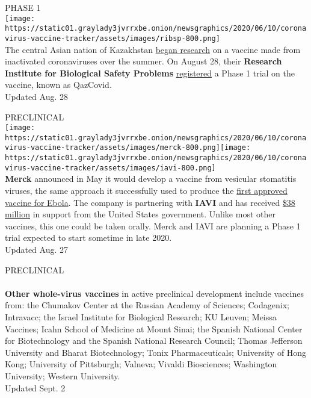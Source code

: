 PHASE 1\\
\texttt{[image: https://static01.graylady3jvrrxbe.onion/newsgraphics/2020/06/10/coronavirus-vaccine-tracker/assets/images/ribsp-800.png]}\\
The central Asian nation of Kazakhstan
\href{https://astanatimes.com/2020/08/human-trials-for-kazakh-covid-19-vaccine-to-start-in-september/}{began
research} on a vaccine made from inactivated coronaviruses over the
summer. On August 28, their \textbf{Research Institute for Biological
Safety Problems}
\href{https://clinicaltrials.gov/ct2/show/NCT04530357?term=vaccine\&recrs=adf\&cond=COVID-19\&phase=0123\&sort=nwst\&draw=2\&rank=1}{registered}
a Phase 1 trial on the vaccine, known as QazCovid.\\
Updated Aug. 28

PRECLINICAL\\
\texttt{[image: https://static01.graylady3jvrrxbe.onion/newsgraphics/2020/06/10/coronavirus-vaccine-tracker/assets/images/merck-800.png]}\texttt{[image: https://static01.graylady3jvrrxbe.onion/newsgraphics/2020/06/10/coronavirus-vaccine-tracker/assets/images/iavi-800.png]}\\
\textbf{Merck} announced in May it would develop a vaccine from
vesicular stomatitis viruses, the same approach it successfully used to
produce the
\href{https://www.fda.gov/news-events/press-announcements/first-fda-approved-vaccine-prevention-ebola-virus-disease-marking-critical-milestone-public-health}{first
approved vaccine for Ebola}. The company is partnering with
\textbf{IAVI} and has received
\href{https://medicalcountermeasures.gov/newsroom/2020/merck-iavi/}{\$38
million} in support from the United States government. Unlike most other
vaccines, this one could be taken orally. Merck and IAVI are planning a
Phase 1 trial expected to start sometime in late 2020.\\
Updated Aug. 27

PRECLINICAL\\
~\\
 \textbf{Other whole-virus vaccines} in active preclinical development
include vaccines from: the Chumakov Center at the Russian Academy of
Sciences; Codagenix; Intravacc; the Israel Institute for Biological
Research; KU Leuven; Meissa Vaccines; Icahn School of Medicine at Mount
Sinai; the Spanish National Center for Biotechnology and the Spanish
National Research Council; Thomas Jefferson University and Bharat
Biotechnology; Tonix Pharmaceuticals; University of Hong Kong;
University of Pittsburgh; Valneva; Vivaldi Biosciences; Washington
University; Western University.\\
Updated Sept. 2

